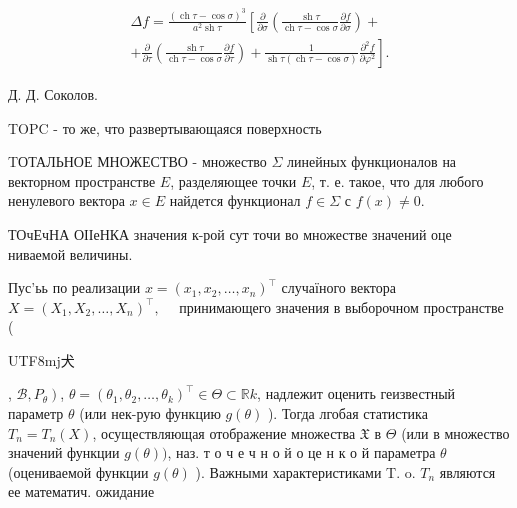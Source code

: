 \documentclass[10pt]{article}
\begin{document}
\[

\begin{gathered}

\Delta f=\frac{(\operatorname{ch} \tau-\cos \sigma)^{3}}{a^{2} \operatorname{sh} \tau}\left[\frac{\partial}{\partial \sigma}\left(\frac{\operatorname{sh} \tau}{\operatorname{ch} \tau-\cos \sigma} \frac{\partial f}{\partial \sigma}\right)+\right. \\

\left.+\frac{\partial}{\partial \tau}\left(\frac{\operatorname{sh} \tau}{\operatorname{ch} \tau-\cos \sigma} \frac{\partial f}{\partial \tau}\right)+\frac{1}{\operatorname{sh} \tau(\operatorname{ch} \tau-\cos \sigma)} \frac{\partial^{2} f}{\partial \varphi^{2}}\right] .

\end{gathered}

\]



Д. Д. Соколов.



TOPC - то же, что развертывающаяся поверхность



TОТАЛЬНОЕ МНОЖЕСТВО - множество $\Sigma$ линейных функционалов на векторном пространстве $E$, разделяющее точки $E$, т. е. такое, что для любого ненулевого вектора $x \in E$ найдется функционал $f \in \Sigma$ с $f(x) \neq 0$.



ТОчЕчНА ОІІеНКА значения к-рой сут точи во множестве значений оце ниваемой величины.



Пус'ьь по реализации $x=\left(x_{1}, x_{2}, \ldots, x_{n}\right)^{\top}$ случаїного вектора $X=\left(X_{1}, X_{2}, \ldots, X_{n}\right)^{\top}, \quad$ принимающего значения в выборочном пространстве (\begin{CJK}{UTF8}{mj}犬\end{CJK}, $\left.\mathscr{B}, P_{\theta}\right)$, $\theta=\left(\theta_{1}, \theta_{2}, \ldots, \theta_{k}\right)^{\top} \in \Theta \subset \mathbb{R} k$, надлежит оценить геизвестный параметр $\theta$ (или нек-рую функцию $g(\theta)$ ). Тогда лгобая статистика $T_{n}=T_{n}(X)$, осуществляющая отображение множества $\mathfrak{X}$ в $\Theta$ (или в множество значений функции $g(\theta))$, наз. т о ч е ч н о й о це н к о й параметра $\theta$ (оцениваемой функции $g(\theta)$ ). Важными характеристиками T. o. $T_{n}$ являются ее математич. ожидание
\end{document}
